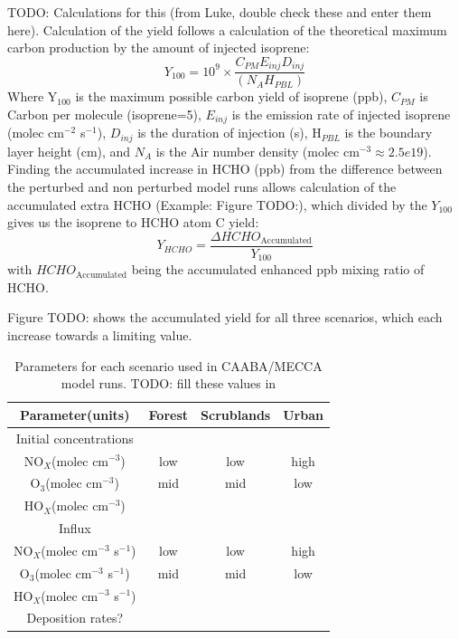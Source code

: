     TODO: Calculations for this (from Luke, double check these and enter them here).
    Calculation of the yield follows a calculation of the theoretical maximum carbon production by the amount of injected isoprene:
    \begin{equation}
    Y_{100} =10^9 \times \frac{C_{PM} E_{inj} D_{inj}}{(N_A H_{PBL})}
    \end{equation}
    Where Y$_{100}$ is the maximum possible carbon yield of isoprene (ppb), $C_{PM}$ is Carbon per molecule (isoprene=5), $E_{inj}$ is the emission rate of injected isoprene (molec cm$^{-2}$ s$^{-1}$), $D_{inj}$ is the duration of injection (s), H$_{PBL}$ is the boundary layer height (cm), and $N_A$ is the Air number density (molec cm$^{-3} \approx 2.5e19$).
    Finding the accumulated increase in HCHO (ppb) from the difference between the perturbed and non perturbed model runs allows calculation of the accumulated extra HCHO (Example: Figure TODO:), which divided by the $Y_{100}$ gives us the isoprene to HCHO atom C yield:
    \begin{equation}
    Y_{HCHO}= \frac{\Delta HCHO_{\text{Accumulated}}}{Y_{100}}
    \end{equation}
    with $HCHO_{\text{Accumulated}}$ being the accumulated enhanced ppb mixing ratio of HCHO.
    
    Figure TODO: shows the accumulated yield for all three scenarios, which each increase towards a limiting value.
    
    \begin{table}[t]
      \caption{Parameters for each scenario used in CAABA/MECCA model runs. TODO: fill these values in}
      \begin{tabular}{ c |  c   c   c  } 
        \hline
        Parameter(units) 		 & Forest & Scrublands & Urban\\
        \hline
        Initial concentrations & & & \\
        NO$_X$(molec cm$^{-3}$)		 & low  & low  & high \\
        O$_3$(molec cm$^{-3}$)  & mid & mid & low \\
        HO$_X$(molec cm$^{-3}$) & & & \\
        \hline 
        Influx & & & \\
        NO$_X$(molec cm$^{-3}$ s$^{-1}$)		 & low  & low  & high \\
        O$_3$(molec cm$^{-3}$ s$^{-1}$)  & mid & mid & low \\
        HO$_X$(molec cm$^{-3}$ s$^{-1}$) & & & \\
        \hline
        Deposition rates? & & & \\
        \hline
      \end{tabular}
      \label{BioIsop:table:CAABAMECCA_Scenarios}
    \end{table}
    

